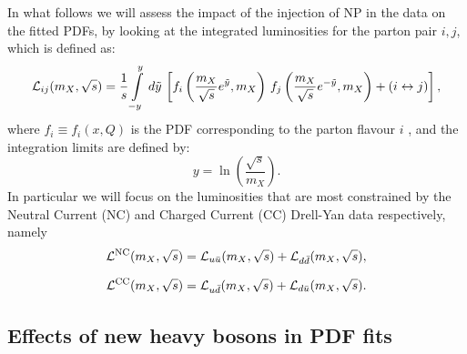 \documentclass[withindex,glossary]{cam-thesis}
\begin{document}
In what follows we will assess the impact of the injection of NP in the data on the 
fitted PDFs, by looking at the integrated luminosities for the parton pair $i,j$, which is defined as:
\begin{equation}
\label{eq:integrated_luminosity}
  {\cal L}_{ij}(m_X,\sqrt{s}) = \frac{1}{s}\int\limits_{-y}^{y}\,d\tilde{y}\,
  \left[
  f_{i}\left(\frac{m_X}{\sqrt{s}}e^{\tilde{y}},m_X\right)\, 
  f_j\left(\frac{m_X}{\sqrt{s}}e^{-\tilde{y}},m_X\right)
  +
  (i \leftrightarrow j)
  \right]
  ,
  \end{equation}
 where $f_i \equiv f_i(x,Q)$ is the PDF corresponding to the parton flavour $i$ 
 , and the integration limits are defined by:
 \begin{equation}
 \label{eq:rapidity}
  y=\ln\left(\frac{\sqrt{s}}{m_X}\right).
  \end{equation}
In particular we will focus on the luminosities that are most constrained by the Neutral Current (NC) and Charged Current (CC) Drell-Yan data respectively, namely   
  \begin{align}
  \label{eq:wzlumi}
    {\cal L}^{\rm NC}(m_X,\sqrt{s}) &= {\cal L}_{u\bar{u}}(m_X,\sqrt{s}) + {\cal L}_{d\bar{d}}(m_X,\sqrt{s}),\\[1.5ex]
      {\cal L}^{\rm CC}(m_X,\sqrt{s}) &= {\cal L}_{u\bar{d}}(m_X,\sqrt{s}) + {\cal L}_{d\bar{u}}(m_X,\sqrt{s}).
    \end{align}

\subsection{Effects of new heavy bosons in PDF fits}
\label{sec:contaminated_pdfs}
\end{document}

